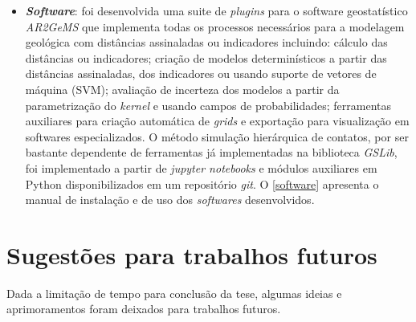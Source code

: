 \begin{itemize}
    \item \textbf{\textit{Software}}: foi desenvolvida uma suite de \textit{plugins} para o software geostatístico \textit{AR2GeMS} que implementa todas os processos necessários para a modelagem geológica com distâncias assinaladas ou indicadores incluindo: cálculo das distâncias ou indicadores; criação de modelos determinísticos a partir das distâncias assinaladas, dos indicadores ou usando suporte de vetores de máquina (SVM); avaliação de incerteza dos modelos a partir da parametrização do \textit{kernel} e usando campos de probabilidades; ferramentas auxiliares para criação automática de \textit{grids} e exportação para visualização em softwares especializados. O método simulação hierárquica de contatos, por ser bastante dependente de ferramentas já implementadas na biblioteca \textit{GSLib}, foi implementado a partir de \textit{jupyter notebooks} e módulos auxiliares em Python disponibilizados em um repositório \textit{git}. O \autoref{software} apresenta o manual de instalação e de uso dos \textit{softwares} desenvolvidos.
    \end{itemize}

\section{Sugestões para trabalhos futuros}

Dada a limitação de tempo para conclusão da tese, algumas ideias e aprimoramentos foram deixados para trabalhos futuros.


